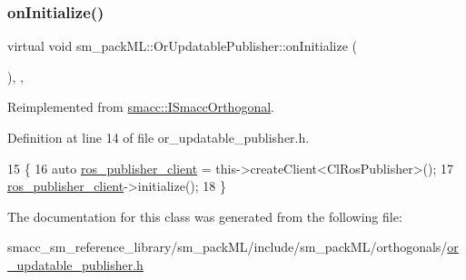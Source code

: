 \subsubsection{\texorpdfstring{on\+Initialize()}{onInitialize()}}
{\footnotesize\ttfamily virtual void sm\+\_\+pack\+M\+L\+::\+Or\+Updatable\+Publisher\+::on\+Initialize (\begin{DoxyParamCaption}{ }\end{DoxyParamCaption})\hspace{0.3cm}{\ttfamily [inline]}, {\ttfamily [override]}, {\ttfamily [virtual]}}



Reimplemented from \hyperlink{classsmacc_1_1ISmaccOrthogonal_a6bb31c620cb64dd7b8417f8705c79c7a}{smacc\+::\+I\+Smacc\+Orthogonal}.



Definition at line 14 of file or\+\_\+updatable\+\_\+publisher.\+h.


\begin{DoxyCode}
15     \{
16         \textcolor{keyword}{auto} \hyperlink{namespaceros__publisher__client}{ros\_publisher\_client} = this->createClient<ClRosPublisher>();
17         \hyperlink{namespaceros__publisher__client}{ros\_publisher\_client}->initialize();
18     \}
\end{DoxyCode}


The documentation for this class was generated from the following file\+:\begin{DoxyCompactItemize}
\item 
smacc\+\_\+sm\+\_\+reference\+\_\+library/sm\+\_\+pack\+M\+L/include/sm\+\_\+pack\+M\+L/orthogonals/\hyperlink{sm__packML_2include_2sm__packML_2orthogonals_2or__updatable__publisher_8h}{or\+\_\+updatable\+\_\+publisher.\+h}\end{DoxyCompactItemize}
